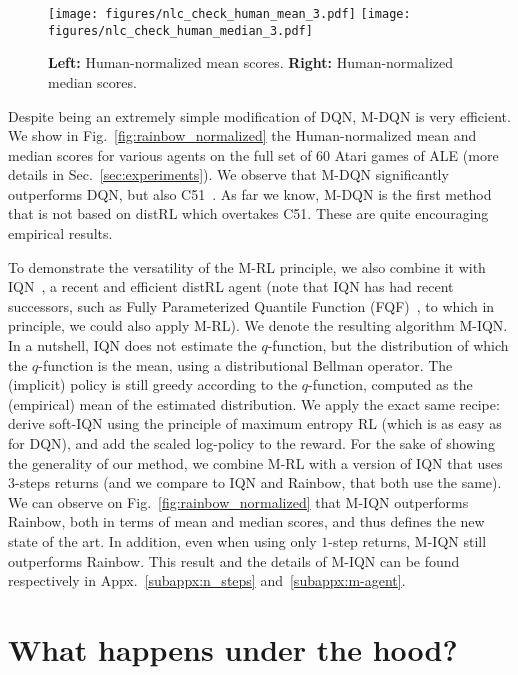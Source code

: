 \documentclass{article}
\begin{document}
\begin{figure}[thb]
    \centering
    \texttt{[image: figures/nlc\_check\_human\_mean\_3.pdf]}
    \texttt{[image: figures/nlc\_check\_human\_median\_3.pdf]}
    \caption{\textbf{Left:} Human-normalized mean scores. \textbf{Right:} Human-normalized median scores.
    }
    \label{fig:human_normalized}
\end{figure}

Despite being an extremely simple modification of DQN, M-DQN is very efficient. We show in Fig.~\ref{fig:rainbow_normalized} the Human-normalized mean and median scores for various agents on the full set of 60 Atari games of ALE (more details in Sec.~\ref{sec:experiments}). We observe that M-DQN significantly outperforms DQN, but also C51~\cite{bellemare2017distributional}. As far we know, M-DQN is the first method that is not based on distRL which overtakes C51. These are quite encouraging empirical results.

To demonstrate the versatility of the M-RL principle, we also combine it with IQN~\cite{dabney2018implicit}, a recent and efficient distRL agent (note that IQN has had recent successors, such as Fully Parameterized Quantile Function (FQF)~\cite{yang2019fully}, to which in principle, we could also apply M-RL). We denote the resulting algorithm M-IQN. In a nutshell, IQN does not estimate the $q$-function, but the distribution of which the $q$-function is the mean, using a distributional Bellman operator. The (implicit) policy is still greedy according to the $q$-function, computed as the (empirical) mean of the estimated distribution. We apply the exact same recipe: derive soft-IQN using the principle of maximum entropy RL (which is as easy as for DQN), and add the scaled log-policy to the reward. For the sake of showing the generality of our method, we combine M-RL with a version of IQN that uses $3$-steps returns (and we compare to IQN and Rainbow, that both use the same). We can observe on Fig.~\ref{fig:rainbow_normalized} that M-IQN outperforms Rainbow, both in terms of mean and median scores, and thus defines the new state of the art. In addition, even when using only $1$-step returns, M-IQN still outperforms Rainbow. This result and the details of M-IQN can be found respectively in Appx.~\ref{subappx:n_steps} and~\ref{subappx:m-agent}.



\section{What happens under the hood? \label{sec:what}}
\end{document}
